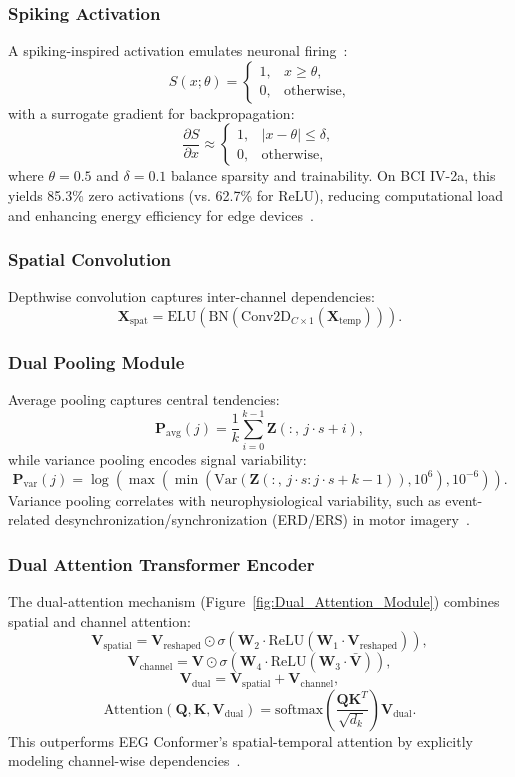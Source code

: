 \documentclass[pdflatex,sn-mathphys-num]{sn-jnl}%
\theoremstyle{thmstyleone}
\theoremstyle{thmstyletwo}
\theoremstyle{thmstylethree}
\begin{document}
\subsubsection{Spiking Activation}
A spiking-inspired activation emulates neuronal firing~\cite{Stanojevic2024-lf}:
\[
S(x; \theta) = \begin{cases} 1, & x \ge \theta, \\ 0, & \text{otherwise}, \end{cases}
\]
with a surrogate gradient for backpropagation:
\[
\frac{\partial S}{\partial x} \approx \begin{cases} 1, & |x - \theta| \le \delta, \\ 0, & \text{otherwise}, \end{cases}
\]
where \(\theta = 0.5\) and \(\delta = 0.1\) balance sparsity and trainability. On BCI IV-2a, this yields 85.3\% zero activations (vs. 62.7\% for ReLU), reducing computational load and enhancing energy efficiency for edge devices~\cite{neftci2019surrogate}.

\subsubsection{Spatial Convolution}
Depthwise convolution captures inter-channel dependencies:
\[
\mathbf{X}_{\text{spat}} = \text{ELU}(\text{BN}(\text{Conv2D}_{C \times 1}(\mathbf{X}_{\text{temp}}))).
\]

\subsubsection{Dual Pooling Module}
Average pooling captures central tendencies:
\[
\mathbf{P}_{\text{avg}}(j) = \frac{1}{k} \sum_{i=0}^{k-1} \mathbf{Z}(:,\, j \cdot s + i),
\]
while variance pooling encodes signal variability:
\[
\mathbf{P}_{\text{var}}(j) = \log \left( \max \left( \min \left( \text{Var} \left( \mathbf{Z}(:,\, j \cdot s : j \cdot s + k - 1) \right), 10^6 \right), 10^{-6} \right) \right).
\]
Variance pooling correlates with neurophysiological variability, such as event-related desynchronization/synchronization (ERD/ERS) in motor imagery~\cite{roy2019chronnectome}.

\subsubsection{Dual Attention Transformer Encoder}
The dual-attention mechanism (Figure~\ref{fig:Dual_Attention_Module}) combines spatial and channel attention:
\[
\mathbf{V}_{\text{spatial}} = \mathbf{V}_{\text{reshaped}} \odot \sigma(\mathbf{W}_2 \cdot \text{ReLU}(\mathbf{W}_1 \cdot \mathbf{V}_{\text{reshaped}})),
\]
\[
\mathbf{V}_{\text{channel}} = \mathbf{V} \odot \sigma(\mathbf{W}_4 \cdot \text{ReLU}(\mathbf{W}_3 \cdot \bar{\mathbf{V}})),
\]
\[
\mathbf{V}_{\text{dual}} = \mathbf{V}_{\text{spatial}} + \mathbf{V}_{\text{channel}},
\]
\[
\text{Attention}(\mathbf{Q}, \mathbf{K}, \mathbf{V}_{\text{dual}}) = \text{softmax}\left(\frac{\mathbf{Q}\mathbf{K}^T}{\sqrt{d_k}}\right)\mathbf{V}_{\text{dual}}.
\]
This outperforms EEG Conformer’s spatial-temporal attention by explicitly modeling channel-wise dependencies~\cite{song2023eeg}.
\end{document}
